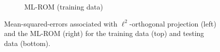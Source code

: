\documentclass[3p,computermodern,10pt]{elsarticle}
\begin{document}
\begin{figure}
\begin{center}
\begin{subfigure}[t]{0.49\textwidth}
\caption{ML-ROM (training data)}
\end{subfigure}
\caption{Mean-squared-errors associated with $\ell^2$-orthogonal projection (left) and the ML-ROM (right) for the training data (top) and testing data (bottom).}
\label{fig:burg_training_test_projection_mse}
\end{center}
\end{figure}
\end{document}
